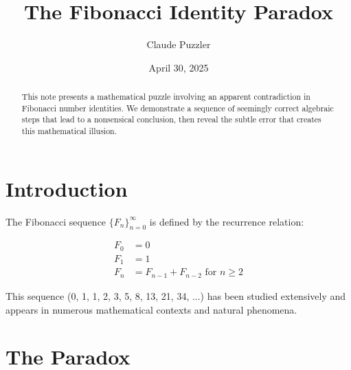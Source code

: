 \documentclass{article}
\title{The Fibonacci Identity Paradox}
\author{Claude Puzzler}
\date{April 30, 2025}
\begin{document}
\maketitle

\begin{abstract}
    This note presents a mathematical puzzle involving an apparent contradiction in Fibonacci number identities. We demonstrate a sequence of seemingly correct algebraic steps that lead to a nonsensical conclusion, then reveal the subtle error that creates this mathematical illusion.
\end{abstract}

\section{Introduction}

The Fibonacci sequence $\{F_n\}_{n=0}^{\infty}$ is defined by the recurrence relation:

\begin{align}
    F_0 &= 0\\
    F_1 &= 1\\
    F_n &= F_{n-1} + F_{n-2} \text{ for } n \geq 2
\end{align}

This sequence (0, 1, 1, 2, 3, 5, 8, 13, 21, 34, ...) has been studied extensively and appears in numerous mathematical contexts and natural phenomena.

\section{The Paradox}
\end{document}
